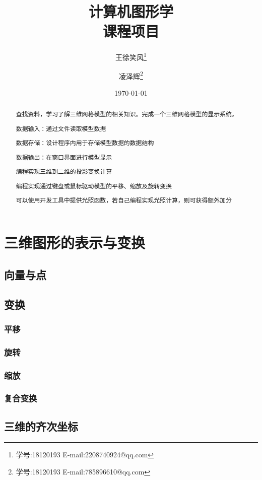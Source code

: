 \documentclass[12pt,oneside,a4paper]{ctexart}
\begin{document}
\title{计算机图形学 \\ 课程项目}
\author{ 王徐笑风\thanks{学号:18120193 E-mail:2208740924@qq.com}
	\and 凌泽辉\thanks{学号:18120193 E-mail:785896610@qq.com}}
\date{\today}
\maketitle
\newpage
\tableofcontents
\newpage
\begin{abstract}
	查找资料，学习了解三维网格模型的相关知识。完成一个三维网格模型的显示系统。

	数据输入：通过文件读取模型数据

	数据存储：设计程序内用于存储模型数据的数据结构

	数据输出：在窗口界面进行模型显示

	编程实现三维到二维的投影变换计算

	编程实现通过键盘或鼠标驱动模型的平移、缩放及旋转变换

	可以使用开发工具中提供光照函数，若自己编程实现光照计算，则可获得额外加分
\end{abstract}

\section{三维图形的表示与变换}
\subsection{向量与点}
\subsection{变换}
\subsubsection{平移}
\subsubsection{旋转}
\subsubsection{缩放}
\subsubsection{复合变换}
\subsection{三维的齐次坐标}
\end{document}
